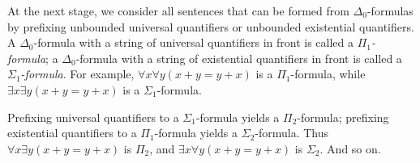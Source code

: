 


At the next stage,
we consider all sentences that can be formed from $\Delta_{0}$-formulas
by prefixing unbounded universal quantifiers or unbounded existential quantifiers.
A $\Delta_{0}$-formula with a string of universal quantifiers in front
is called a \emph{$\Pi_{1}$-formula};
a $\Delta_{0}$-formula with a string of existential quantifiers in front
is called a \emph{$\Sigma_{1}$-formula}.
For example,
$\forall x \forall y (x + y = y + x)$ is a $\Pi_{1}$-formula,
while $\exists x \exists y (x + y = y + x)$ is a $\Sigma_{1}$-formula.

Prefixing universal quantifiers to a $\Sigma_{1}$-formula yields a $\Pi_{2}$-formula;
prefixing existential quantifiers to a $\Pi_{1}$-formula yields a $\Sigma_{2}$-formula.
Thus $\forall x \exists y (x + y = y + x)$ is $\Pi_{2}$,
and $\exists x \forall y (x + y = y + x)$ is $\Sigma_{2}$.
And so on.

